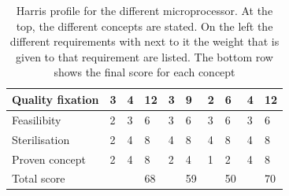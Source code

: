 \documentclass[whitelogo]{tudelft-report}
\begin{document}
{{{\begin{table}[]
\begin{tabular}{|l|l|l|l|l|l|l|l|l|l|}
		Quality fixation        & 3         & 4                                                     & 12    & 3                                                       & 9     & 2                                                      & 6     & 4                                                       & 12     \\ \hline
		Feasilibity             & 2         & 3                                                     & 6     & 3                                                       & 6     & 3                                                      & 6     & 3                                                       & 6     \\ \hline
		Sterilisation           & 2         & 4                                                     & 8     & 4                                                       & 8     & 4                                                      & 8     & 4                                                       & 8     \\ \hline
		Proven concept          & 2         & 4                                                     & 8     & 2                                                       & 4     & 1                                                      & 2     & 4                                                       & 8     \\ \hline
		Total score             &           &                                                       & 68    &                                                         & 59    &                                                        & 50    &                                                         & 70    \\ \hline
	\end{tabular}
\caption{Harris profile for the different microprocessor. At the top, the different concepts are stated. On the left the different requirements with next to it the weight that is given to that requirement are listed. The bottom row shows the final score for each concept}
\label{table:draglift1}
\end{table}

}}}
\end{document}

